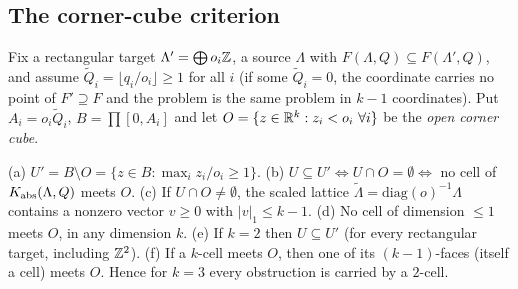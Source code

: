 \subsection{The corner-cube criterion}
Fix a rectangular target $\Lambda'=\bigoplus o_i\mathbb Z$, a source $\Lambda$ with $F(\Lambda,Q)\subseteq F(\Lambda',Q)$, and assume $\tilde Q_i=\lfloor q_i/o_i\rfloor\ge1$ for all $i$ (if some $\tilde Q_i=0$, the coordinate carries no point of $F'\supseteq F$ and the problem is the same problem in $k-1$ coordinates). Put $A_i=o_i\tilde Q_i$, $B=\prod[0,A_i]$ and let $O=\{z\in\mathbb R^k:z_i<o_i\ \forall i\}$ be the \emph{open corner cube}.
\begin{theorem}\label{thm:corner}
(a) $U'=B\setminus O=\{z\in B:\max_iz_i/o_i\ge1\}$.
(b) $U\subseteq U'\iff U\cap O=\emptyset\iff$ no cell of $K_{\mathrm{abs}}(\Lambda,Q)$ meets $O$.
(c) If $U\cap O\ne\emptyset$, the scaled lattice $\tilde\Lambda=\mathrm{diag}(o)^{-1}\Lambda$ contains a nonzero vector $v\ge0$ with $|v|_1\le k-1$.
(d) No cell of dimension $\le1$ meets $O$, in any dimension $k$.
(e) If $k=2$ then $U\subseteq U'$ (for every rectangular target, including $\mathbb Z^2$).
(f) If a $k$-cell meets $O$, then one of its $(k-1)$-faces (itself a cell) meets $O$. Hence for $k=3$ every obstruction is carried by a $2$-cell.
\end{theorem}
